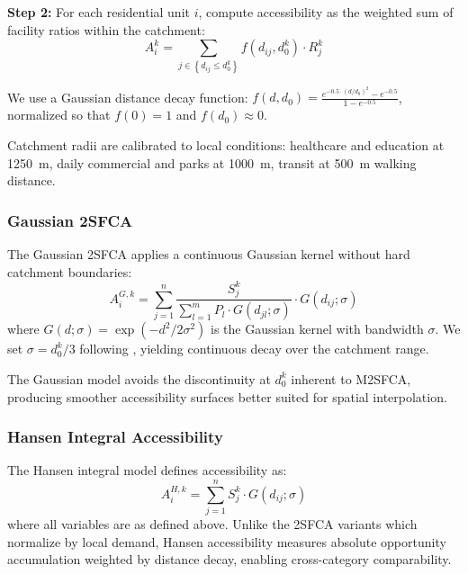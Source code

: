 \documentclass[preprint,12pt,authoryear]{elsarticle}
\begin{document}
\textbf{Step 2:} For each residential unit $i$, compute accessibility as the weighted sum of facility ratios within the catchment:
\begin{equation}
A_i^k = \sum_{j \in \left\{d_{ij} \leq d_0^k\right\}} f(d_{ij}, d_0^k) \cdot R_j^k
\label{eq:m2sfca_step2}
\end{equation}

We use a Gaussian distance decay function: $f(d, d_0) = \frac{e^{-0.5 \cdot (d / d_0)^2} - e^{-0.5}}{1 - e^{-0.5}}$, normalized so that $f(0) = 1$ and $f(d_0) \approx 0$.

Catchment radii are calibrated to local conditions: healthcare and education at \SI{1250}{\meter}, daily commercial and parks at \SI{1000}{\meter}, transit at \SI{500}{\meter} walking distance.

\subsubsection{Gaussian 2SFCA}
\label{sec:gaussian_2sfca}

The Gaussian 2SFCA applies a continuous Gaussian kernel without hard catchment boundaries:
\begin{equation}
A_i^{G,k} = \sum_{j=1}^{n} \frac{S_j^k}{\sum_{l=1}^{m} P_l \cdot G(d_{jl}; \sigma)} \cdot G(d_{ij}; \sigma)
\label{eq:gaussian_2sfca}
\end{equation}
where $G(d; \sigma) = \exp(-d^2 / 2\sigma^2)$ is the Gaussian kernel with bandwidth $\sigma$. We set $\sigma = d_0^k / 3$ following \citet{comber2008using}, yielding continuous decay over the catchment range.

The Gaussian model avoids the discontinuity at $d_0^k$ inherent to M2SFCA, producing smoother accessibility surfaces better suited for spatial interpolation.

\subsubsection{Hansen Integral Accessibility}
\label{sec:hansen}

The Hansen integral model defines accessibility as:
\begin{equation}
A_i^{H,k} = \sum_{j=1}^{n} S_j^k \cdot G(d_{ij}; \sigma)
\label{eq:hansen}
\end{equation}
where all variables are as defined above. Unlike the 2SFCA variants which normalize by local demand, Hansen accessibility measures absolute opportunity accumulation weighted by distance decay, enabling cross-category comparability.
\end{document}
